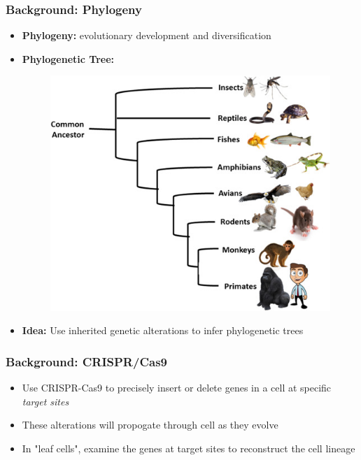 \documentclass[
	11pt, %
]{beamer}
\begin{document}

\begin{frame}
	\frametitle{Background: Phylogeny}

	\begin{itemize}
		\item \textbf{Phylogeny:} evolutionary development and diversification
		
		\item \textbf{Phylogenetic Tree:}
		\begin{figure}
			\includegraphics[width=0.5\linewidth]{phylogeny-background.jpeg}
		\end{figure}

		\item \textbf{Idea:} Use inherited genetic alterations to infer phylogenetic trees

	\end{itemize}

\end{frame}


\begin{frame}
	\frametitle{Background: CRISPR/Cas9}

	\begin{itemize}
		\item Use CRISPR-Cas9 to precisely insert or delete genes in a cell at specific \emph{target sites}
		\item These alterations will propogate through cell as they evolve
		\item In "leaf cells", examine the genes at target sites to reconstruct the cell lineage
	\end{itemize}

\end{frame}

\end{document}
